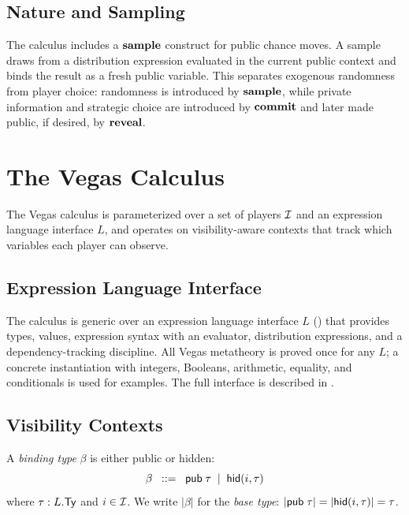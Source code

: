 \documentclass[11pt]{article}
\begin{document}
\subsection{Nature and Sampling}

The calculus includes a $\mathbf{sample}$ construct for public chance moves. A sample
draws from a distribution expression evaluated in the current public context
and binds the result as a fresh public variable. This separates exogenous
randomness from player choice: randomness is introduced by $\mathbf{sample}$, while
private information and strategic choice are introduced by $\mathbf{commit}$ and later
made public, if desired, by $\mathbf{reveal}$.


\section{The Vegas Calculus}\label{sec:calculus}

The Vegas calculus is parameterized over a set of players $\mathcal{I}$ and an
expression language interface $L$, and operates on visibility-aware contexts
that track which variables each player can observe.

\subsection{Expression Language Interface}

The calculus is generic over an expression language interface $L$
() that provides types, values, expression syntax with an
evaluator, distribution expressions, and a dependency-tracking discipline.
All Vegas metatheory is proved once for any $L$; a concrete instantiation with
integers, Booleans, arithmetic, equality, and conditionals is used for
examples. The full interface is described in .

\subsection{Visibility Contexts}\label{sec:vctx}

\begin{definition}
A \emph{binding type} $\beta$ is either public or hidden:
\[
  \beta \;\;::=\;\; \mathsf{pub}\;\tau \;\mid\; \mathsf{hid}(i, \tau)
\]
where $\tau : L.\mathsf{Ty}$ and $i \in \mathcal{I}$. We write $|\beta|$ for the
\emph{base type}: $|\mathsf{pub}\;\tau| = |\mathsf{hid}(i,\tau)| = \tau$.
\end{definition}
\end{document}
